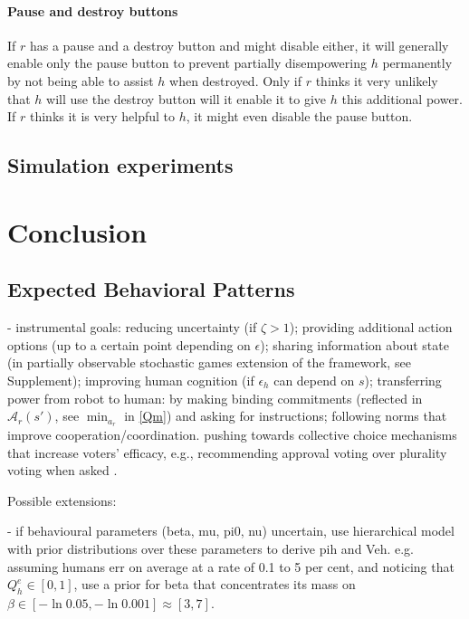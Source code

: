 \documentclass[letterpaper]{article} %
\def\A{\mathcal{A}}
\begin{document}
\paragraph{Pause and destroy buttons}
If $r$ has a pause and a destroy button and might disable either, it will generally enable only the pause button to prevent partially disempowering $h$ permanently by not being able to assist $h$ when destroyed. 
Only if $r$ thinks it very unlikely that $h$ will use the destroy button will it enable it to give $h$ this additional power.
If $r$ thinks it is very helpful to $h$, it might even disable the pause button.


\subsection{Simulation experiments}



\section{Conclusion}


\subsection{Expected Behavioral Patterns}


- instrumental goals:
reducing uncertainty (if $\zeta>1$);
providing additional action options (up to a certain point depending on $\epsilon$);
sharing information about state (in partially observable stochastic games extension of the framework, see Supplement);
improving human cognition (if $\epsilon_h$ can depend on $s$);
transferring power from robot to human: by making binding commitments (reflected in $\A_r(s')$, see $\min_{a_r}$ in \eqref{Qm}) and asking for instructions;
following norms that improve cooperation/coordination.
pushing towards collective choice mechanisms that increase voters' efficacy, e.g., recommending approval voting over plurality voting when asked \cite{rapoport1990efficacy}.


Possible extensions: 

- if behavioural parameters (beta, mu, pi0, nu) uncertain, use hierarchical model with prior distributions over these parameters to derive pih and Veh.
e.g. assuming humans err on average at a rate of 0.1 to 5 per cent, and noticing that $Q^e_h\in[0,1]$, use a prior for beta that concentrates its mass on $\beta\in[-\ln 0.05,-\ln 0.001]\approx[3,7]$.
\end{document}
